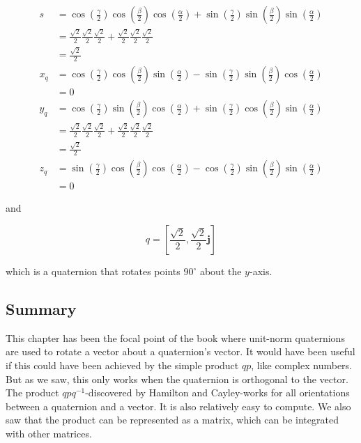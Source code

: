 \documentclass[10pt]{article}
\begin{document}
$$
\begin{aligned}
s & =\cos \left(\frac{\gamma}{2}\right) \cos \left(\frac{\beta}{2}\right) \cos \left(\frac{\alpha}{2}\right)+\sin \left(\frac{\gamma}{2}\right) \sin \left(\frac{\beta}{2}\right) \sin \left(\frac{\alpha}{2}\right) \\
& =\frac{\sqrt{2}}{2} \frac{\sqrt{2}}{2} \frac{\sqrt{2}}{2}+\frac{\sqrt{2}}{2} \frac{\sqrt{2}}{2} \frac{\sqrt{2}}{2} \\
& =\frac{\sqrt{2}}{2} \\
x_{q} & =\cos \left(\frac{\gamma}{2}\right) \cos \left(\frac{\beta}{2}\right) \sin \left(\frac{\alpha}{2}\right)-\sin \left(\frac{\gamma}{2}\right) \sin \left(\frac{\beta}{2}\right) \cos \left(\frac{\alpha}{2}\right) \\
& =0 \\
y_{q} & =\cos \left(\frac{\gamma}{2}\right) \sin \left(\frac{\beta}{2}\right) \cos \left(\frac{\alpha}{2}\right)+\sin \left(\frac{\gamma}{2}\right) \cos \left(\frac{\beta}{2}\right) \sin \left(\frac{\alpha}{2}\right) \\
& =\frac{\sqrt{2}}{2} \frac{\sqrt{2}}{2} \frac{\sqrt{2}}{2}+\frac{\sqrt{2}}{2} \frac{\sqrt{2}}{2} \frac{\sqrt{2}}{2} \\
& =\frac{\sqrt{2}}{2} \\
z_{q} & =\sin \left(\frac{\gamma}{2}\right) \cos \left(\frac{\beta}{2}\right) \cos \left(\frac{\alpha}{2}\right)-\cos \left(\frac{\gamma}{2}\right) \sin \left(\frac{\beta}{2}\right) \sin \left(\frac{\alpha}{2}\right) \\
& =0
\end{aligned}
$$

and

$$
q=\left[\frac{\sqrt{2}}{2}, \frac{\sqrt{2}}{2} \mathbf{j}\right]
$$

which is a quaternion that rotates points $90^{\circ}$ about the $y$-axis.

\subsection{Summary}
This chapter has been the focal point of the book where unit-norm quaternions are used to rotate a vector about a quaternion's vector. It would have been useful if this could have been achieved by the simple product $q p$, like complex numbers. But as we saw, this only works when the quaternion is orthogonal to the vector. The product $q p q^{-1}$-discovered by Hamilton and Cayley-works for all orientations between a quaternion and a vector. It is also relatively easy to compute. We also saw that the product can be represented as a matrix, which can be integrated with other matrices.
\end{document}
